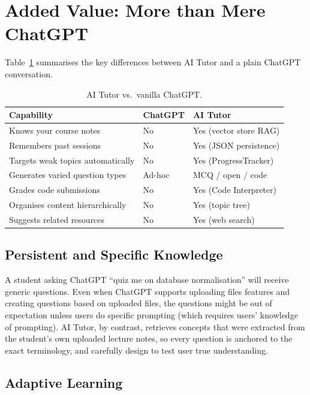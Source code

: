 \documentclass[12pt,a4paper]{article}
\begin{document}
\section{Added Value: More than Mere ChatGPT}

Table~\ref{tab:comparison} summarises the key differences between AI Tutor
and a plain ChatGPT conversation.

\begin{table}[H]
\centering
\caption{AI Tutor vs.\ vanilla ChatGPT.}
\label{tab:comparison}
\begin{tabular}{lll}
\toprule
\textbf{Capability} & \textbf{ChatGPT} & \textbf{AI Tutor} \\
\midrule
Knows your course notes            & No  & Yes (vector store RAG) \\
Remembers past sessions            & No  & Yes (JSON persistence) \\
Targets weak topics automatically  & No  & Yes (ProgressTracker) \\
Generates varied question types    & Ad-hoc & MCQ / open / code \\
Grades code submissions            & No  & Yes (Code Interpreter) \\
Organises content hierarchically   & No  & Yes (topic tree) \\
Suggests related resources         & No  & Yes (web search) \\
\bottomrule
\end{tabular}
\end{table}

\subsection{Persistent and Specific Knowledge}

A student asking ChatGPT ``quiz me on database normalisation'' will receive
generic questions. Even when ChatGPT supports uploading files features and creating questions based on uploaded files, the questions might be out of expectation unless users do specific prompting (which requires users' knowledge of prompting). AI Tutor, by contrast,
retrieves concepts that were extracted from the student's own
uploaded lecture notes, so every question is anchored to the exact
terminology, and carefully design to test user true understanding.

\subsection{Adaptive Learning}
\end{document}
